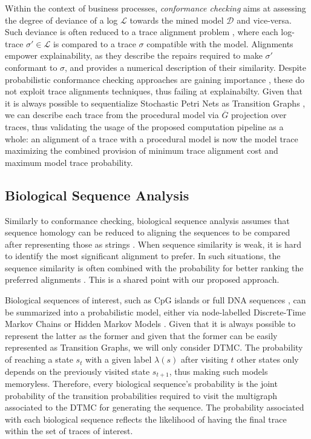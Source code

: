 Within the context of business processes, \textit{conformance checking} aims at assessing the degree of deviance of a log $\mathcal{L}$ towards the mined model $\mathcal{D}$ and vice-versa. Such deviance is often reduced to a  trace alignment problem \cite{DBLP:conf/edoc/AdriansyahDA11}, where each log-trace $\sigma'\in\mathcal{L}$ is compared to a trace $\sigma$ compatible with the model. Alignments empower explainability, as they describe the repairs required to make $\sigma'$ conformant to $\sigma$, and provides a numerical description of  their similarity.  Despite probabilistic conformance checking approaches are gaining importance \cite{DBLP:conf/bpm/LeemansSA19,DBLP:conf/icpm/PolyvyanyyK19,DBLP:journals/tosem/PolyvyanyySWCM20}, these do not exploit trace alignments techniques, thus failing at explainabilty. Given that it is always possible to sequentialize Stochastic Petri Nets as Transition Graphs \cite{MarsanCB84}, we can describe each trace from the procedural model via $\overline{G}$ projection over traces, thus validating the usage of the proposed computation pipeline as a whole: an alignment of a trace with a procedural model is now the model trace maximizing the combined provision of minimum trace alignment cost and maximum model trace probability.



\subsection{Biological Sequence Analysis}
Similarly to conformance checking, biological sequence analysis assumes that sequence homology can be reduced to aligning the sequences to be compared after representing those as strings \cite{durbin1998biological}. When sequence similarity is weak, it is hard to identify the most significant alignment to prefer. In such situations, the sequence similarity is often combined with the probability for better ranking the preferred alignments \cite{durbin1998biological}. This is a shared point with our proposed approach. 

Biological sequences of interest, such as CpG islands \cite{kxq005} or full DNA sequences \cite{BISHOP1986159}, can be summarized into a probabilistic model, either via node-labelled Discrete-Time Markov Chains \cite{RyabkoU08} or Hidden Markov Models \cite{Helske2018}. Given that it is always possible to represent the latter as the former \cite{DUPONT20051349} and given that the former can be easily represented as Transition Graphs, we will only consider DTMC. The probability of reaching a state $s_t$ with a given label $\lambda(s)$ after visiting $t$ other states only depends on the previously visited state $s_{t+1}$, thus making such models memoryless. Therefore, every biological sequence's probability is the joint probability of the transition probabilities required to visit the multigraph associated to the DTMC for generating the sequence. The probability associated with each biological sequence reflects the likelihood of having the final trace within the set of traces of interest. 

